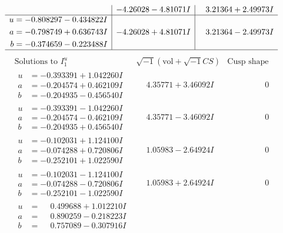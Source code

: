 \documentclass[1p]{elsarticle_modified}
\theoremstyle{definition}
\newcommand{\I}{\sqrt{-1}}
\begin{document}
$$\begin{array}{c|c|c}
 & -4.26028 - 4.81071 I & \phantom{-}3.21364 + 2.49973 I \\ \hline\begin{aligned}
u &= -0.808297 - 0.434822 I \\
a &= -0.798749 + 0.636743 I \\
b &= -0.374659 - 0.223488 I\end{aligned}
 & -4.26028 + 4.81071 I & \phantom{-}3.21364 - 2.49973 I\\
 \hline 
 \end{array}$$\newpage$$\begin{array}{c|c|c}  
\text{Solutions to }I^u_{1}& \I (\text{vol} + \sqrt{-1}CS) & \text{Cusp shape}\\
 \hline 
\begin{aligned}
u &= -0.393391 + 1.042260 I \\
a &= -0.204574 + 0.462109 I \\
b &= -0.204935 - 0.456540 I\end{aligned}
 & \phantom{-}4.35771 + 3.46092 I & \phantom{-0.000000 } 0 \\ \hline\begin{aligned}
u &= -0.393391 - 1.042260 I \\
a &= -0.204574 - 0.462109 I \\
b &= -0.204935 + 0.456540 I\end{aligned}
 & \phantom{-}4.35771 - 3.46092 I & \phantom{-0.000000 } 0 \\ \hline\begin{aligned}
u &= -0.102031 + 1.124100 I \\
a &= -0.074288 + 0.720806 I \\
b &= -0.252101 + 1.022590 I\end{aligned}
 & \phantom{-}1.05983 - 2.64924 I & \phantom{-0.000000 } 0 \\ \hline\begin{aligned}
u &= -0.102031 - 1.124100 I \\
a &= -0.074288 - 0.720806 I \\
b &= -0.252101 - 1.022590 I\end{aligned}
 & \phantom{-}1.05983 + 2.64924 I & \phantom{-0.000000 } 0 \\ \hline\begin{aligned}
u &= \phantom{-}0.499688 + 1.012210 I \\
a &= \phantom{-}0.890259 - 0.218223 I \\
b &= \phantom{-}0.757089 - 0.307916 I\end{aligned}

\end{array}$$
\end{document}
